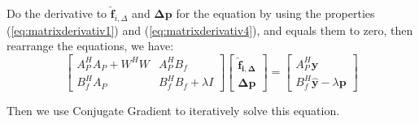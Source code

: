 \documentclass[12pt]{article}
\numberwithin{equation}{section}
\begin{document}
{Do the derivative to $\hat{\bm {f}}_{i, \Delta}$ and $\bm{\Delta p}$ for the equation by using the properties (\ref{eq:matrixderivativ1}) and (\ref{eq:matrixderivativ4}), and equals them to zero, then rearrange the equations, we have:
\begin{equation} \label{eq:eco}
	\begin{bmatrix}
		A^H_PA_P+W^HW & A^H_PB_f \\
		B^H_fA_P			& B^H_fB_f+\lambda I
	\end{bmatrix}
	\begin{bmatrix}
		\bm{\hat{f}_{i, \Delta}} \\
		\bm{\Delta p}
	\end{bmatrix}
	=
	\begin{bmatrix}
		A^H_P\bm{\hat{y}} \\
		B^H_f\bm{\hat{y}} -\lambda \bm{p}
	\end{bmatrix}
\end{equation} \par
Then we use Conjugate Gradient to iteratively solve this equation. 
}
\end{document}

